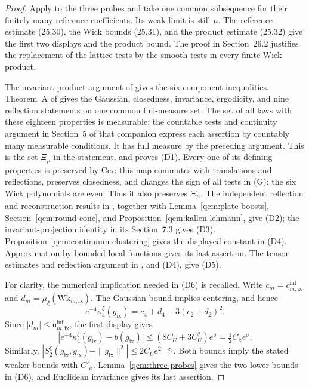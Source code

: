\documentclass[11pt,letterpaper,reqno]{amsart}
\theoremstyle{definition}
\begin{document}
\begin{proof}
Apply \cite[Proposition~25.4 and Section~26.2]{QEDConstruction}
to the three probes and take one common subsequence for their
finitely many reference coefficients. Its weak limit is still
$\mu$. The reference estimate (25.30), the Wick bounds (25.31),
and the product estimate (25.32) give the first two displays and
the product bound. The proof in Section~26.2 justifies the
replacement of the lattice tests by the smooth tests in every
finite Wick product.

The invariant-product argument of
\cite[Lemma~26.1 and equation~(26.2)]{QEDConstruction} gives the
six component inequalities. Theorem~A of \cite{ErgodicComponents}
gives the Gaussian, closedness, invariance, ergodicity, and nine
reflection statements on one common full-measure set.
The set of all laws with these eighteen properties is measurable:
the countable tests and continuity argument in Section~5 of that
companion express each assertion by countably many measurable
conditions. It has full measure by the preceding argument.
This is the set $\Xi_\mu$ in the statement, and proves (D1).
Every one of its defining properties is preserved by
$\mathrm{Cc}_*$: this map commutes with translations and
reflections, preserves closedness, and changes the sign of all
tests in (G); the six Wick polynomials are even. Thus it also
preserves $\Xi_\mu$.
The independent reflection and reconstruction
results in \cite[Sections~7--8]{QEDConstruction}, together with
Lemma~\ref{qcm:plate-boosts}, Section~\ref{qcm:round-cone}, and
Proposition~\ref{qcm:kallen-lehmann}, give (D2); the invariant-projection
identity in its Section~7.3 gives (D3).
Proposition~\ref{qcm:continuum-clustering} gives the displayed
constant in (D4). Approximation by bounded local functions gives
its last assertion. The tensor estimates and reflection argument
in \cite[Sections~5.3 and~27]{QEDConstruction}, and (D4), give
(D5).

For clarity, the numerical implication needed in (D6) is recalled.
Write $c_m=c^{\mathrm{inf}}_{m,\mathrm{ix}}$ and
$d_m=\mu_\xi(\mathrm{Wk}_{m,\mathrm{ix}})$.
The Gaussian bound implies centering, and hence
\[
 e^{-4}\kappa_4^\xi(g_{\mathrm{ix}})
       =c_4+d_4-3(c_2+d_2)^2.
\]
Since $|d_m|\le\mathsf u^{\mathrm{inf}}_{m,\mathrm{ix}}$,
the first display gives
\[
 |e^{-4}\kappa_4^\xi(g_{\mathrm{ix}})-b(g_{\mathrm{ix}})|
 \le(8C_U+3C_U^2)e^\sigma
       =\tfrac12C_{\bar\kappa}e^\sigma.
\]
Similarly,
$|S_2^\xi(g_{\mathrm{ix}},g_{\mathrm{ix}})
-\|g_{\mathrm{ix}}\|^2|\le2C_Ue^{2-\mathfrak e_2}$.
Both bounds imply the stated weaker bounds with $C'_{\bar\kappa}$.
Lemma~\ref{qcm:three-probes} gives the two lower bounds in (D6),
and Euclidean invariance gives its last assertion.
\end{proof}
\end{document}
